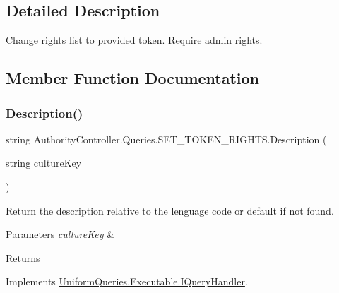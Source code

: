 \subsection{Detailed Description}
Change rights list to provided token. Require admin rights. 



\subsection{Member Function Documentation}
\mbox{\label{class_authority_controller_1_1_queries_1_1_s_e_t___t_o_k_e_n___r_i_g_h_t_s_a149fb8950cf0ebbcb47b6a238c6458d2}} 
\subsubsection{\texorpdfstring{Description()}{Description()}}
{\footnotesize\ttfamily string Authority\+Controller.\+Queries.\+S\+E\+T\+\_\+\+T\+O\+K\+E\+N\+\_\+\+R\+I\+G\+H\+T\+S.\+Description (\begin{DoxyParamCaption}\item[{string}]{culture\+Key }\end{DoxyParamCaption})}



Return the description relative to the lenguage code or default if not found. 


\begin{DoxyParams}{Parameters}
{\em culture\+Key} & \\
\hline
\end{DoxyParams}
\begin{DoxyReturn}{Returns}

\end{DoxyReturn}


Implements \mbox{\hyperlink{interface_uniform_queries_1_1_executable_1_1_i_query_handler_ae0e55919571d5456af31298394d241a9}{Uniform\+Queries.\+Executable.\+I\+Query\+Handler}}.

